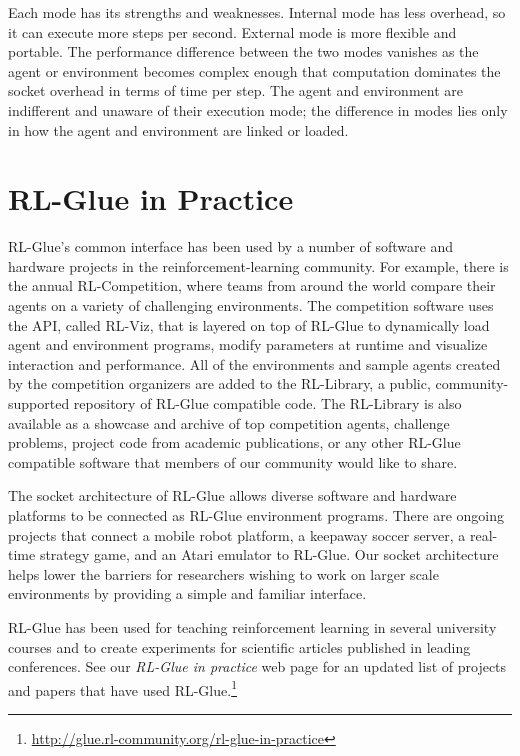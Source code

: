 \documentclass[twoside,11pt]{article}
\begin{document}
Each mode has its strengths and weaknesses. Internal mode has less overhead, so it can execute more steps per second. External mode is more flexible and portable.  The performance difference between the two modes vanishes as the agent or environment becomes complex enough that computation dominates the socket overhead in terms of time per step.  The agent and environment are indifferent and unaware of their execution mode; the difference in modes lies only in how the agent and environment are linked or loaded.

\section{RL-Glue in Practice}
\vspace{-0.2cm}
RL-Glue's common interface has been used by a number of software and hardware projects in the reinforcement-learning community. For example, there is the annual RL-Competition, where teams from around the world compare their agents on a variety of challenging environments.  The competition software uses the API, called RL-Viz, that is layered on top of RL-Glue to dynamically load agent and environment programs, modify parameters at runtime and visualize interaction and performance.  All of the environments and sample agents created by the competition organizers are added to the RL-Library, a public, community-supported repository of RL-Glue compatible code. The RL-Library is also available as a showcase and archive of top competition agents, challenge problems, project code from academic publications, or any other RL-Glue compatible software that members of our community would like to share.


The socket architecture of RL-Glue allows diverse software and hardware platforms to be connected as RL-Glue environment programs.  There are ongoing projects that connect a mobile robot platform, a keepaway soccer server, a real-time strategy game, and an Atari emulator to RL-Glue. Our socket architecture helps lower the barriers for researchers wishing to work on larger scale environments by providing a simple and familiar interface. %

RL-Glue has been used for teaching reinforcement learning in several university courses and to create experiments for scientific articles published in leading conferences.  See our \textit{RL-Glue in practice} web page for an updated list of projects and papers that have used RL-Glue.\footnote{\url{http://glue.rl-community.org/rl-glue-in-practice}} 
\end{document}
